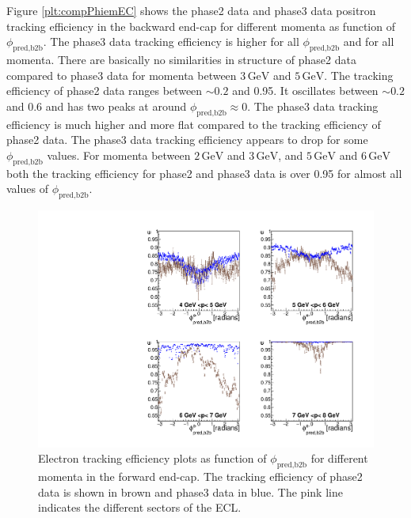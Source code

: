 \documentclass[a4paper,11pt,twosided,final,german,openbib,pdftex,listof=totoc,bibliography=totoc]{scrbook}
\begin{document}
Figure \ref{plt:compPhiemEC} shows the phase2 data and phase3 data positron tracking efficiency in the backward end-cap for different momenta as function of $\phi_{\textrm{pred,b2b}}$.
The phase3 data tracking efficiency is higher for all $\phi_{\textrm{pred,b2b}}$ and for all momenta.
There are basically no similarities in structure of phase2 data compared to phase3 data for momenta between $3\,\textrm{GeV}$ and $5\,\textrm{GeV}$. The tracking efficiency of phase2 data ranges between $\sim 0.2$ and 0.95. It oscillates between $\sim 0.2$ and 0.6 and has two peaks at around $\phi_{\textrm{pred,b2b}} \approx 0$.
The phase3 data tracking efficiency is much higher and more flat compared to the tracking efficiency of phase2 data. The phase3 data tracking efficiency appears to drop for some $\phi_{\textrm{pred,b2b}}$ values.
For momenta between $2\,\textrm{GeV}$ and $3\,\textrm{GeV}$, and $5\,\textrm{GeV}$ and $6\,\textrm{GeV}$ both the tracking efficiency for phase2 and phase3 data is over 0.95 for almost all values of $\phi_{\textrm{pred,b2b}}$.


\begin{figure}[!htbp]
	\centering
	\includegraphics[width=\textwidth]{Plots/comp/cMPhiemFC_Data.pdf}
	\caption[Momentum $\phi_{\textrm{pred,b2b}}$ Electron Efficiency Forward End-Cap Phase2 And Phase3 Data]{Electron tracking efficiency plots as function of $\phi_{\textrm{pred,b2b}}$ for different momenta in the forward end-cap. The tracking efficiency of phase2 data is shown in brown and phase3 data in blue. The pink line indicates the different sectors of the ECL.}
	\label{plt:compPhiemFC}
\end{figure}
\end{document}
